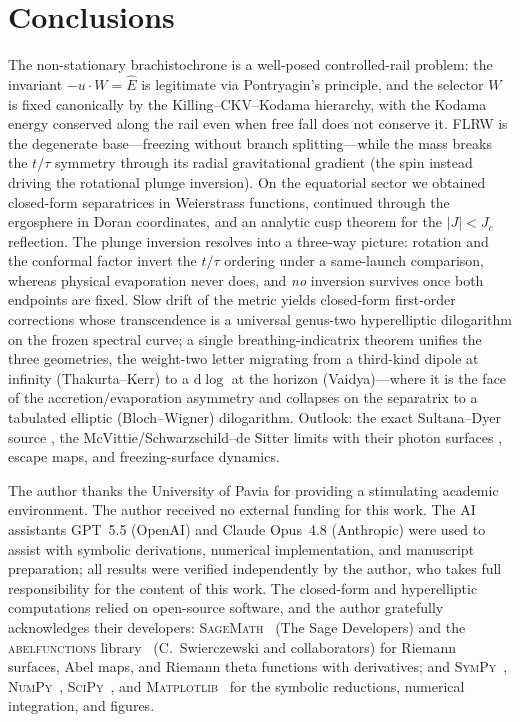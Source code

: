 \documentclass[12pt]{iopart}
\newcommand{\Ehat}{\hat E}
\newcommand{\Jc}{J_{c}}
\newcommand{\dd}{\mathrm{d}}
\begin{document}
\section{Conclusions}
\label{sec:concl}
The non-stationary brachistochrone is a well-posed controlled-rail problem: the
invariant $-u\cdot W=\Ehat$ is legitimate via Pontryagin's principle, and the
selector $W$ is fixed canonically by the Killing--CKV--Kodama hierarchy, with
the Kodama energy conserved along the rail even when free fall does not conserve
it. FLRW is the degenerate base---freezing without branch splitting---while the
mass breaks the $t/\tau$ symmetry through its radial gravitational gradient (the
spin instead driving the rotational plunge inversion). On
the equatorial sector we obtained closed-form separatrices in Weierstrass
functions, continued through the ergosphere in Doran coordinates, and an analytic
cusp theorem for the $|J|<\Jc$ reflection. The plunge inversion resolves into a
three-way picture: rotation and the conformal factor invert the $t/\tau$
ordering under a same-launch comparison, whereas physical evaporation never does,
and \emph{no} inversion survives once both endpoints are fixed. Slow drift of the
metric yields closed-form first-order corrections whose transcendence is a
universal genus-two hyperelliptic dilogarithm on the frozen spectral curve; a
single breathing-indicatrix theorem unifies the three geometries, the weight-two
letter migrating from a third-kind dipole at infinity (Thakurta--Kerr) to a
$\dd\log$ at the horizon (Vaidya)---where it is the face of the
accretion/evaporation asymmetry and collapses on the separatrix to a tabulated
elliptic (Bloch--Wigner) dilogarithm. Outlook: the
exact Sultana--Dyer source
\cite{SultanaDyer2005}, the McVittie/Schwarzschild--de Sitter limits
\cite{McVittie1933,Kottler1918,Kaloper2010} with their photon surfaces
\cite{ClaudelViracVirbhadra2001}, escape maps, and freezing-surface dynamics.

\ack
The author thanks the University of Pavia for providing a stimulating academic
environment. The author received no external funding for this work. The AI
assistants GPT~5.5 (OpenAI) and Claude Opus~4.8 (Anthropic) were used to assist with
symbolic derivations, numerical implementation, and manuscript preparation; all
results were verified independently by the author, who takes full responsibility
for the content of this work. The closed-form and hyperelliptic computations relied
on open-source software, and the author gratefully acknowledges their developers:
\textsc{SageMath}~\cite{SageMath} (The Sage Developers) and the
\textsc{abelfunctions} library~\cite{abelfunctions} (C.~Swierczewski and
collaborators) for Riemann surfaces, Abel maps, and Riemann theta functions with
derivatives; and \textsc{SymPy}~\cite{SymPy}, \textsc{NumPy}~\cite{NumPy},
\textsc{SciPy}~\cite{SciPy}, and \textsc{Matplotlib}~\cite{Matplotlib} for the
symbolic reductions, numerical integration, and figures.
\end{document}
